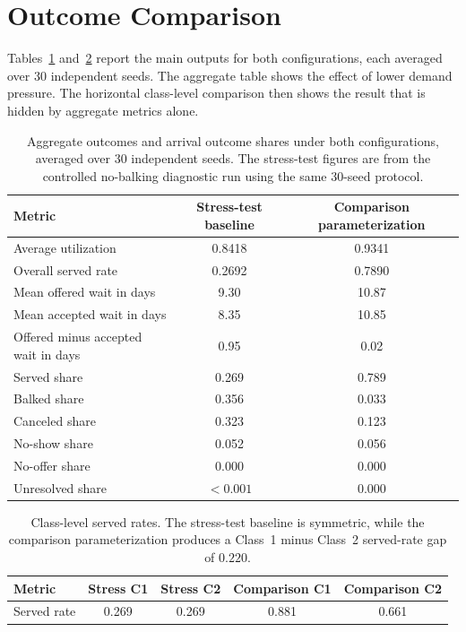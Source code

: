 \documentclass[11pt]{article}
\begin{document}
\section{Outcome Comparison}

Tables~\ref{tab:aggregate-outcomes} and~\ref{tab:class-outcomes} report the
main outputs for both configurations, each averaged over 30 independent seeds.
The aggregate table shows the effect of lower demand pressure. The horizontal
class-level comparison then shows the result that is hidden by aggregate
metrics alone.

\begin{table}[H]
\centering
\renewcommand{\arraystretch}{1.15}
\small
\begin{tabularx}{0.78\textwidth}{>{\raggedright\arraybackslash}Xcc}
\toprule
Metric & Stress-test baseline & Comparison parameterization \\
\midrule
Average utilization & 0.8418 & 0.9341 \\
Overall served rate & 0.2692 & 0.7890 \\
Mean offered wait in days & 9.30 & 10.87 \\
Mean accepted wait in days & 8.35 & 10.85 \\
Offered minus accepted wait in days & 0.95 & 0.02 \\
\midrule
Served share & 0.269 & 0.789 \\
Balked share & 0.356 & 0.033 \\
Canceled share & 0.323 & 0.123 \\
No-show share & 0.052 & 0.056 \\
No-offer share & 0.000 & 0.000 \\
Unresolved share & $<0.001$ & 0.000 \\
\bottomrule
\end{tabularx}
\caption{Aggregate outcomes and arrival outcome shares under both
configurations, averaged over 30 independent seeds. The stress-test figures are
from the controlled no-balking diagnostic run using the same 30-seed protocol.}
\label{tab:aggregate-outcomes}
\end{table}

\begin{table}[H]
\centering
\renewcommand{\arraystretch}{1.15}
\small
\begin{tabular}{lcccc}
\toprule
Metric & Stress C1 & Stress C2 & Comparison C1 & Comparison C2 \\
\midrule
Served rate & 0.269 & 0.269 & 0.881 & 0.661 \\
\bottomrule
\end{tabular}
\caption{Class-level served rates. The stress-test baseline is symmetric, while
the comparison parameterization produces a Class~1 minus Class~2 served-rate gap
of $0.220$.}
\label{tab:class-outcomes}
\end{table}
\end{document}
